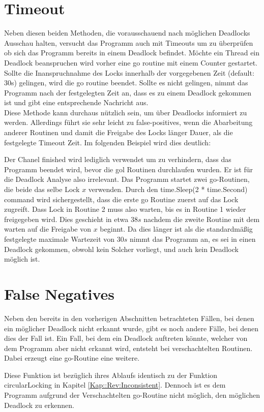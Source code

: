 \section{Timeout}
Neben diesen beiden Methoden, die vorausschauend nach möglichen Deadlocks 
Ausschau halten, versucht das Programm auch mit Timeouts um zu überprüfen ob 
sich das Programm bereits in einem Deadlock befindet. Möchte ein Thread ein 
Deadlock beanspruchen wird vorher eine go routine mit einem Counter gestartet.
Sollte die Inanspruchnahme des Locks innerhalb der vorgegebenen Zeit 
(default: 30s) gelingen, wird die go routine beendet. Sollte es nicht gelingen,
nimmt das Programm nach der festgelegten Zeit an, dass es zu einem Deadlock 
gekommen ist und gibt eine entsprechende Nachricht aus.\\
Diese Methode kann
durchaus nützlich sein, um über Deadlocks informiert zu werden. Allerdings führt
sie sehr leicht zu false-positives, wenn die Abarbeitung anderer Routinen und 
damit die Freigabe des Locks länger Dauer, als die festgelegte Timeout Zeit.
Im folgenden Beispiel wird dies deutlich:
\begin{figure}[H]
    
\end{figure}
Der Chanel finished wird lediglich verwendet um zu verhindern, dass das Programm 
beendet wird, bevor die gol Routinen durchlaufen wurden. Er ist für die Deadlock
Analyse also irrelevant. Das Programm startet zwei go-Routinen, die beide das 
selbe Lock $x$ verwenden. Durch den time.Sleep(2 * time.Second) command wird 
sichergestellt, dass die erste go Routine zuerst auf das Lock zugreift. 
Dass Lock in Routine 2 muss also warten, bis es in Routine 1 wieder freigegeben
wird. Dies geschieht in etwa $38 s$ nachdem die zweite Routine mit dem warten 
auf die Freigabe von $x$ beginnt. Da dies länger ist als die standardmäßig
festgelegte maximale Wartezeit von $30 s$ nimmt das Programm an, es sei in einen 
Deadlock gekommen, obwohl kein Solcher vorliegt, und auch kein Deadlock möglich 
ist.

\section{False Negatives}
Neben den bereits in den vorherigen Abschnitten betrachteten Fällen, bei denen 
ein möglicher Deadlock nicht erkannt wurde, gibt es noch andere Fälle, bei denen
dies der Fall ist. Ein Fall,
bei dem ein Deadlock auftreten könnte, welcher von dem Programm aber nicht erkannt
wird, entsteht bei verschachtelten Routinen. Dabei erzeugt eine go-Routine eine 
weitere.
\begin{figure}[H]
    
\end{figure}
Diese Funktion ist bezüglich ihres Ablaufs identisch zu der Funktion 
circularLocking in Kapitel \ref*{Kap::Rev:Inconsistent}. Dennoch ist es dem 
Programm aufgrund der Verschachtelten go-Routine nicht möglich, den möglichen 
Deadlock zu erkennen. 
